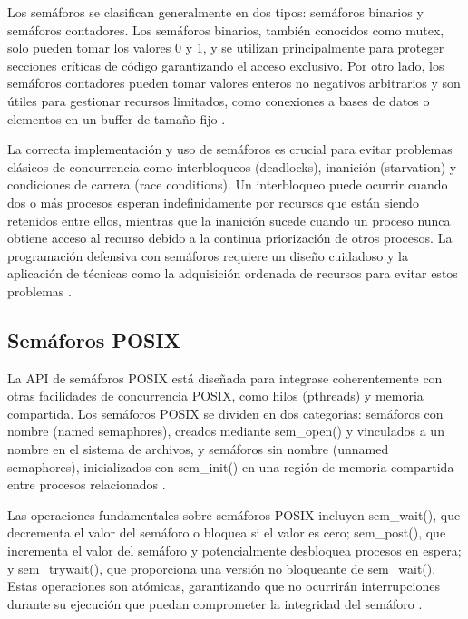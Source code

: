 {Los semáforos se clasifican generalmente en dos tipos: semáforos binarios y semáforos contadores. Los semáforos binarios, también conocidos como mutex, solo pueden tomar los valores 0 y 1, y se utilizan principalmente para proteger secciones críticas de código garantizando el acceso exclusivo. Por otro lado, los semáforos contadores pueden tomar valores enteros no negativos arbitrarios y son útiles para gestionar recursos limitados, como conexiones a bases de datos o elementos en un buffer de tamaño fijo \cite{kerrisk2010linux}.
\vspace{10pt}

La correcta implementación y uso de semáforos es crucial para evitar problemas clásicos de concurrencia como interbloqueos (deadlocks), inanición (starvation) y condiciones de carrera (race conditions). Un interbloqueo puede ocurrir cuando dos o más procesos esperan indefinidamente por recursos que están siendo retenidos entre ellos, mientras que la inanición sucede cuando un proceso nunca obtiene acceso al recurso debido a la continua priorización de otros procesos. La programación defensiva con semáforos requiere un diseño cuidadoso y la aplicación de técnicas como la adquisición ordenada de recursos para evitar estos problemas \cite{herlihy2012art}.

\subsection{Semáforos POSIX}

La API de semáforos POSIX está diseñada para integrase coherentemente con otras facilidades de concurrencia POSIX, como hilos (pthreads) y memoria compartida. Los semáforos POSIX se dividen en dos categorías: semáforos con nombre (named semaphores), creados mediante sem\_open() y vinculados a un nombre en el sistema de archivos, y semáforos sin nombre (unnamed semaphores), inicializados con sem\_init() en una región de memoria compartida entre procesos relacionados \cite{butenhof1997programming}.
\vspace{10pt}

Las operaciones fundamentales sobre semáforos POSIX incluyen sem\_wait(), que decrementa el valor del semáforo o bloquea si el valor es cero; sem\_post(), que incrementa el valor del semáforo y potencialmente desbloquea procesos en espera; y sem\_trywait(), que proporciona una versión no bloqueante de sem\_wait(). Estas operaciones son atómicas, garantizando que no ocurrirán interrupciones durante su ejecución que puedan comprometer la integridad del semáforo \cite{stevens2005unix}.
\vspace{10pt}

}
